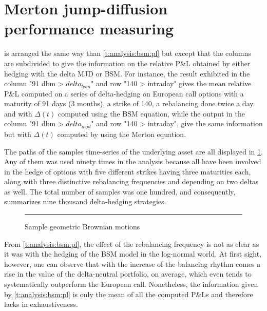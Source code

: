 \documentclass[12pt]{report}
\begin{document}
\section{Merton jump-diffusion performance measuring}
\label{sec:section name}

 is arranged the same way than \cref{t:analysis:bsm:pl} but except that the columns are subdivided to give the information on the relative P\&L obtained by either hedging with the delta MJD or BSM.
For instance, the result exhibited in the column "91 dbm > $delta_{bsm}$" and row "140 > intraday" gives the mean relative P\&L computed on a series of delta-hedging on European call options with a maturity of 91 days (3 months), a strike of 140, a rebalancing done twice a day and with $\Delta(t)$ computed using the BSM equation, while the output in the column "91 dbm > $delta_{mjd}$" and row "140 > intraday", give the same information but with $\Delta(t)$ computed by using the Merton equation.

The paths of the samples time-series of the underlying asset are all displayed in \cref{p:analysis:mjd:100}. 
Any of them was used ninety times in the analysis because all have been involved in the hedge of options with five different strikes having three maturities each, along with three distinctive rebalancing frequencies and depending on two deltas as well.
The total number of samples was one hundred, and consequently,  summarizes nine thousand delta-hedging strategies.

\begin{figure}[ht]
  \centering
  \rule{40mm}{20mm}
  \caption{Sample geometric Brownian motions}
  \label{p:analysis:mjd:100}
\end{figure}






From \cref{t:analysis:bsm:pl}, the effect of the rebalancing frequency is not as clear as it was with the hedging of the BSM model in the log-normal world.
At first sight, however, one can observe that with the increase of the balancing rhythm comes a rise in the value of the delta-neutral portfolio, on average, which even tends to systematically outperform the European call.
Nonetheless, the information given by \cref{t:analysis:bsm:pl} is only the mean of all the computed P\&Ls and therefore lacks in exhaustiveness.
\end{document}
